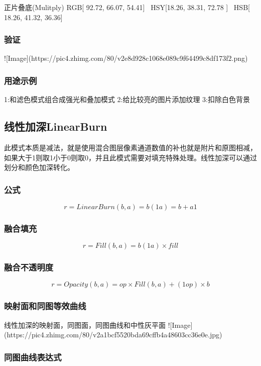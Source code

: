正片叠底(Mulitply)      RGB[ 92.72,  66.07,  54.41]~ HSY[18.26,  38.31,  72.78 ]~ HSB[ 18.26,  41.32,  36.36]


\subsubsection{ 验证}

![Image](https://pic4.zhimg.com/80/v2e8d928c1068e089c9f64499c8df173f2.png)

\subsubsection{ 用途示例}

1:和滤色模式组合成强光和叠加模式
2:给比较亮的图片添加纹理
3:扣除白色背景

\subsection{ 线性加深LinearBurn}

此模式本质是减法，就是使用混合图层像素通道数值的补也就是附片和原图相减，如果大于1则取1小于0则取0，并且此模式需要对填充特殊处理。线性加深可以通过划分和颜色加深转化。

\subsubsection{ 公式}

$$r=LinearBurn(b,a)=b(1a)=b+a1$$

\subsubsection{ 融合填充}

$$r= Fill(b,a) =b(1a)\times fill$$

\subsubsection{ 融合不透明度}

$$r=Opacity(b,a)=op\times Fill(b,a)+(1op)\times b$$

\subsubsection{ 映射面和同图等效曲线}

线性加深的映射面，同图面，同图曲线和中性灰平面
![Image](https://pic4.zhimg.com/80/v2a1bcf5520bda69cffb4a48603cc36e0e.jpg)

\subsubsection{ 同图曲线表达式}

